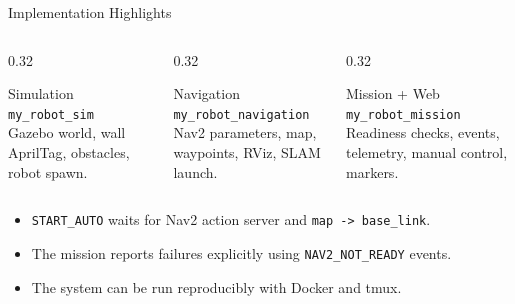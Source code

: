 \documentclass[aspectratio=169,11pt]{beamer}
\begin{document}
\begin{frame}{Implementation Highlights}
  \begin{columns}[T,onlytextwidth]
    \begin{column}{0.32\textwidth}
      \begin{block}{Simulation}
        \small
        \texttt{my\_robot\_sim}\\
        Gazebo world, wall AprilTag, obstacles, robot spawn.
      \end{block}
    \end{column}
    \begin{column}{0.32\textwidth}
      \begin{block}{Navigation}
        \small
        \texttt{my\_robot\_navigation}\\
        Nav2 parameters, map, waypoints, RViz, SLAM launch.
      \end{block}
    \end{column}
    \begin{column}{0.32\textwidth}
      \begin{block}{Mission + Web}
        \small
        \texttt{my\_robot\_mission}\\
        Readiness checks, events, telemetry, manual control, markers.
      \end{block}
    \end{column}
  \end{columns}

  \vspace{0.9em}
  \begin{itemize}
    \item \texttt{START\_AUTO} waits for Nav2 action server and \texttt{map -> base\_link}.
    \item The mission reports failures explicitly using \texttt{NAV2\_NOT\_READY} events.
    \item The system can be run reproducibly with Docker and tmux.
  \end{itemize}
\end{frame}
\end{document}

